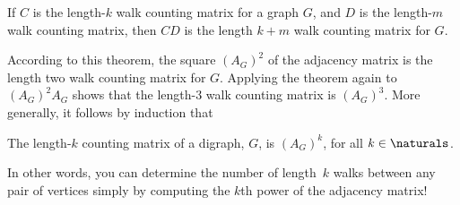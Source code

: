 \begin{theorem}\label{thm:CkDm}
 If $C$ is the length-$k$ walk counting matrix for a graph $G$, and
 $D$ is the length-$m$ walk counting matrix, then $CD$ is the length
 $k+m$ walk counting matrix for $G$.
\end{theorem}

According to this theorem, the square $(A_G)^2$ of the adjacency
matrix is the length two walk counting matrix for $G$.  Applying the
theorem again to $(A_G)^2A_G$ shows that the length-3 walk counting
matrix is $(A_G)^3$.  More generally, it follows by induction that
\begin{corollary}\label{AGklenk}
The length-$k$ counting matrix of a digraph, $G$, is $(A_G)^k$, for
all $k \in \naturals$.
\end{corollary}
In other words, you can determine the number of length~$k$ walks
between any pair of vertices simply by computing the $k$th power of
the adjacency matrix!   \iffalse

For example, the first three powers of the adjacency matrix for the
graph in Figure~\ref{fig:5AD} are:
\begin{align*}
    A &= \begin{pmatrix}
            0 & 1 & 1 & 1 \\
            1 & 0 & 1 & 0 \\
            1 & 1 & 0 & 1 \\
            1 & 0 & 1 & 0
         \end{pmatrix} & %
  A^2 &= \begin{pmatrix}
            3 & 1 & 2 & 1 \\
            1 & 2 & 1 & 2 \\
            2 & 1 & 3 & 1 \\
            1 & 2 & 1 & 2
         \end{pmatrix} & %
  A^3 &= \begin{pmatrix}
            4 & 5 & 5 & 5 \\
            5 & 2 & 5 & 2 \\
            5 & 5 & 4 & 5 \\
            5 & 2 & 5 & 2
         \end{pmatrix}
\end{align*}

Sure enough, $(A^3)_{14}$ is $5$, which is the number of length~3 walks
from~$v_1$ to~$v_4$.  And $(A^3)_{24} = 2$, which is the number of
length~3 walks from $v_2$ to~$v_4$.  
\fi

